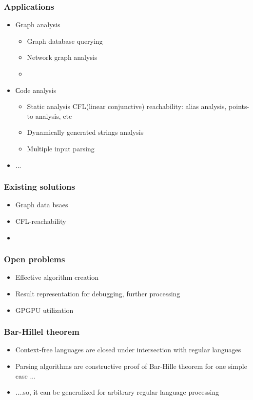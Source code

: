 \documentclass{beamer}
\begin{document}
\begin{frame}[fragile]
  \transwipe[direction=90]
  \frametitle{Applications}
  \begin{itemize}
    \item Graph analysis
    \begin{itemize}
      \item Graph database querying
      \item Network graph analysis
      \item  
    \end{itemize}
    \item Сode analysis
    \begin{itemize}
      \item Static analysis CFL(linear conjunctive) reachability: alias analysis, points-to analysis, etc
      \item Dynamically generated strings analysis
      \item Multiple input parsing 
    \end{itemize}
    \item ...
  \end{itemize}
\end{frame}

\begin{frame}
  \transwipe[direction=90]
  \frametitle{Existing solutions}
  \begin{itemize}
    \item Graph data bsaes
    \item CFL-reachability
    \item 
  \end{itemize}
\end{frame}

\begin{frame}
  \transwipe[direction=90]
  \frametitle{Open problems}
  \begin{itemize}
    \item Effective algorithm creation
    \item Result representation for debugging, further processing 
    \item GPGPU utilization
  \end{itemize}
\end{frame}

\begin{frame}
  \transwipe[direction=90]
  \frametitle{Bar-Hillel theorem}
  \begin{itemize}
    \item Context-free languages are closed under intersection with regular languages
    \item Parsing algorithms are constructive proof of Bar-Hille theorem for one simple case ...
    \item ....so, it can be generalized for arbitrary regular language processing
  \end{itemize}
\end{frame}
\end{document}

